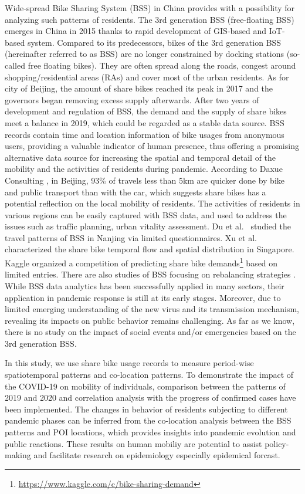 \documentclass[ijgi,submit,moreauthors,pdftex]{Definitions/mdpi}
\begin{document}
Wide-spread Bike Sharing System (BSS) in China provides with a possibility for analyzing such patterns of residents.
The 3rd generation BSS (free-floating BSS) emerges in China in 2015 thanks to rapid development of GIS-based and IoT-based system. 
Compared to its predecessors, bikes of the 3rd generation BSS (hereinafter referred to as BSS) are no longer constrained by docking stations (so-called free floating bikes).
They are often spread along the roads, congest around shopping/residential areas (RAs) and cover most of the urban residents. 
As for city of Beijing, the amount of share bikes reached its peak in 2017 and the governors began removing excess supply afterwards. 
After two years of development and regulation of BSS, the demand and the supply of share bikes meet a balance in 2019, which could be regarded as a stable data source.
BSS records contain time and location information of bike usages from anonymous users, providing a valuable indicator of human presence, thus offering a promising alternative data source for increasing the spatial and temporal detail of the mobility and the activities of residents during pandemic.
According to Daxue Consulting \cite{bssmodel}, in Beijing, 93\% of travels less than 5km are quicker done by bike and public transport than with the car, which suggests share bikes has a potential reflection on the local mobility of residents.
The activities of residents in various regions can be easily captured with BSS data, and used to address the issues such as traffic planning, urban vitality assessment.
Du et al.\ \cite{du2018better} studied the travel patterns of BSS in Nanjing via limited questionnaires.
Xu et al.\ \cite{xu2019unravel} characterized the share bike temporal flow and spatial distribution in Singapore.
Kaggle organized a competition of predicting share bike demands\footnote{\url{https://www.kaggle.com/c/bike-sharing-demand}} based on limited entries.
There are also studies of BSS focusing on rebalancing strategies \cite{pal2017free, ai2019deep,chen2016dynamic}.
While BSS data analytics has been successfully applied in many sectors, their application in pandemic response is still at its early stages.
Moreover, due to limited emerging understanding of the new virus and its transmission mechanism, revealing its impacts on public behavior remains challenging.
As far as we know, there is no study on the impact of social events and/or emergencies based on the 3rd generation BSS.

In this study, we use share bike usage records to measure period-wise spatiotemporal patterns and co-location patterns. 
To demonstrate the impact of the COVID-19 on mobility of individuals, comparison between the patterns of 2019 and 2020 and correlation analysis with the progress of confirmed cases have been implemented.
The changes in behavior of residents subjecting to different pandemic phases can be inferred from the co-location analysis between the BSS patterns and POI locations, which provides insights into pandemic evolution and public reactions.
These results on human mobiliy are potential to assist policy-making and facilitate research on epidemiology especially epidemical forcast.
\end{document}
